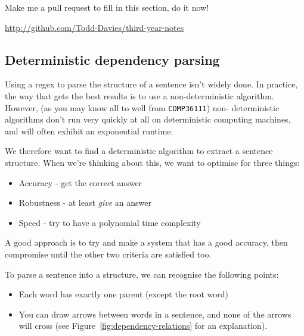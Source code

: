 
Make me a pull request to fill in this section, do it now!

\url{http://github.com/Todd-Davies/third-year-notes}{}


\subsection{Deterministic dependency parsing}

Using a regex to parse the structure of a sentence isn't widely done. In
practice, the way that gets the best results is to use a non-deterministic
algorithm. However, (as you may know all to well from \texttt{COMP36111}) non-
deterministic algorithms don't run very quickly at all on deterministic
computing machines, and will often exhibit an exponential runtime.

We therefore want to find a deterministic algorithm to extract a sentence
structure. When we're thinking about this, we want to optimise for three things:

\begin{itemize}
  \item Accuracy - get the correct answer
  \item Robustness - at least \textit{give} an answer
  \item Speed - try to have a polynomial time complexity
\end{itemize}

A good approach is to try and make a system that has a good accuracy, then
compromise until the other two criteria are satisfied too.

To parse a sentence into a structure, we can recognise the following points:

\begin{itemize}
  \item Each word has exactly one parent (except the root word)
  \item You can draw arrows between words in a sentence, and none of the arrows 
  will cross (see Figure~\ref{fig:dependency-relations} for an explanation).
\end{itemize}


